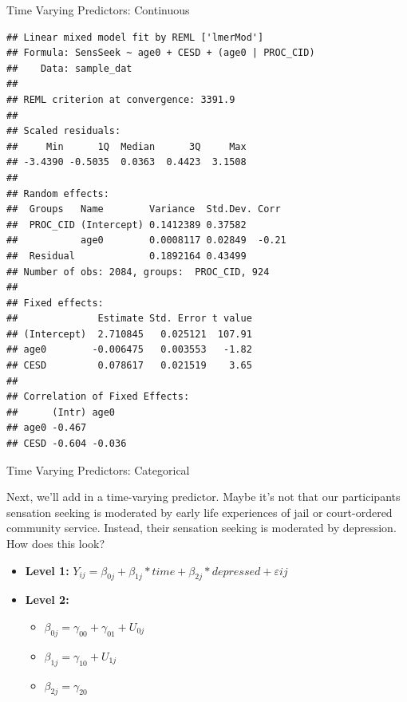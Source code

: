 \begin{frame}[fragile]{Time Varying Predictors: Continuous}

\small

\begin{Shaded}
\begin{Highlighting}[]
\StringTok{ }\OperatorTok{~}\StringTok{ }\OperatorTok{+}\StringTok{ }\OperatorTok{+}\StringTok{ }\OperatorTok{|}
\end{Highlighting}
\end{Shaded}

\tiny

\begin{verbatim}
## Linear mixed model fit by REML ['lmerMod']
## Formula: SensSeek ~ age0 + CESD + (age0 | PROC_CID)
##    Data: sample_dat
## 
## REML criterion at convergence: 3391.9
## 
## Scaled residuals: 
##     Min      1Q  Median      3Q     Max 
## -3.4390 -0.5035  0.0363  0.4423  3.1508 
## 
## Random effects:
##  Groups   Name        Variance  Std.Dev. Corr 
##  PROC_CID (Intercept) 0.1412389 0.37582       
##           age0        0.0008117 0.02849  -0.21
##  Residual             0.1892164 0.43499       
## Number of obs: 2084, groups:  PROC_CID, 924
## 
## Fixed effects:
##              Estimate Std. Error t value
## (Intercept)  2.710845   0.025121  107.91
## age0        -0.006475   0.003553   -1.82
## CESD         0.078617   0.021519    3.65
## 
## Correlation of Fixed Effects:
##      (Intr) age0  
## age0 -0.467       
## CESD -0.604 -0.036
\end{verbatim}

\normalsize

\end{frame}

\begin{frame}{Time Varying Predictors: Categorical}

Next, we'll add in a time-varying predictor. Maybe it's not that our
participants sensation seeking is moderated by early life experiences of
jail or court-ordered community service. Instead, their sensation
seeking is moderated by depression.\\
How does this look?

\begin{itemize}
  \item \textbf{Level 1:} $Y_{ij} = \beta_{0j} + \beta_{1j}*time + \beta_{2j}*depressed + \varepsilon{ij}$
  \item \textbf{Level 2:} 
    \begin{itemize} 
      \item $\beta_{0j} = \gamma_{00} + \gamma_{01} + U_{0j}$
      \item $\beta_{1j} = \gamma_{10} + U_{1j}$
      \item $\beta_{2j} = \gamma_{20}$
    \end{itemize}
\end{itemize}

\end{frame}

